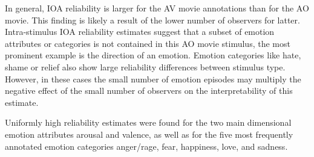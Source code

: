 In general, IOA reliability is larger for the AV movie annotations than for the
AO movie. This finding is likely a result of the lower number of observers for
latter. Intra-stimulus IOA reliability estimates suggest that a subset of
emotion attributes or categories is not contained in this AO movie stimulus,
the most prominent example is the direction of an emotion. Emotion categories
like hate, shame or relief also show large reliability differences between
stimulus type.  However, in these cases the small number of emotion episodes
may multiply the negative effect of the small number of observers on the
interpretability of this estimate.

Uniformly high reliability estimates were found for the two main dimensional
emotion attributes arousal and valence, as well as for the five most frequently
annotated emotion categories anger/rage, fear, happiness, love, and sadness.

